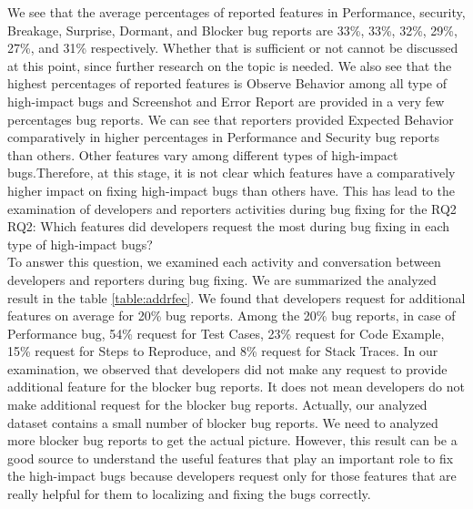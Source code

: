 \documentclass[conference]{IEEEtran}
\begin{document}
We see that the average percentages of reported features in Performance, security, Breakage, Surprise, Dormant, and Blocker bug reports are 33\%, 33\%, 32\%, 29\%, 27\%, and 31\% respectively. Whether that is sufficient or not cannot be discussed at this point, since further research on the topic is needed. We also see that the highest percentages of reported features is Observe Behavior among all type of high-impact bugs and Screenshot and Error Report are provided in a very few percentages bug reports. We can see that reporters provided Expected Behavior comparatively in higher percentages in Performance and Security bug reports than others. Other features vary among different types of high-impact bugs.Therefore, at this stage, it is not clear which features have a comparatively higher impact on fixing high-impact bugs than others have. This has lead to the examination of developers and reporters activities during bug fixing for the RQ2  \\

RQ2: Which features did developers request the most during bug fixing in each type of high-impact bugs?\\

To answer this question, we examined each activity and conversation between developers and reporters during bug fixing. We are summarized the analyzed result in the table \ref{table:addrfec}. We found that developers request for additional features on average for 20\% bug reports. Among the 20\% bug reports, in case of Performance bug, 54\% request for Test Cases, 23\% request for Code Example, 15\% request for Steps to Reproduce, and 8\% request for Stack Traces. In our examination, we observed that developers did not make any request to provide additional feature for the blocker bug reports. It does not mean developers do not make additional request for the blocker bug reports. Actually, our analyzed dataset contains a small number of blocker bug reports. We need to analyzed more blocker bug reports to get the actual picture. However, this result can be a good source to understand the useful features that play an important role to fix the high-impact bugs because developers request only for those features that are really helpful for them to localizing and fixing the bugs correctly.
\end{document}
